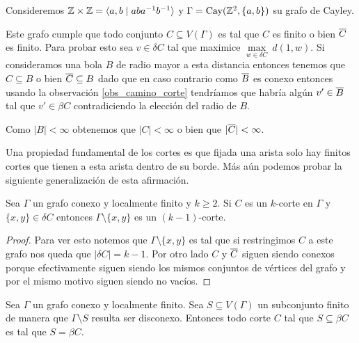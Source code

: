 \documentclass[tesis.tex]{subfiles}
\begin{document}
\begin{ej}
	Consideremos $\mathbb{Z} \times \mathbb{Z} = \langle a,b \mid aba^{-1}b^{-1} \rangle$ y 
	$\Gamma = \text{Cay}(\mathbb{Z}^2, \{ a, b \})$ su grafo de Cayley.
	
	Este grafo cumple que todo conjunto $C \subseteq V(\Gamma)$ es tal que $C$ es finito o bien $\overline C$ es finito.
	Para probar esto sea $v \in \delta C$ tal que
	maximice $\underset{w \in \delta C}{\max} \ d(1,w)$.
	Si consideramos una bola $B$ de radio mayor a esta distancia entonces tenemos que $C \subseteq B$ o bien $\overline C \subseteq B$ dado que en caso contrario como $\overline B$ es conexo entonces usando la observación \ref{obs_camino_corte} tendríamos que habría algún $v' \in \overline B$ tal que $v' \in \beta C$ contradiciendo la elección del radio de $B$.
	
	Como $|B| < \infty$ obtenemos que $|C| < \infty$ o bien que $|\overline C| < \infty$.
\end{ej}

Una propiedad fundamental de los cortes es que fijada una arista solo hay finitos cortes que tienen a esta arista dentro de su borde.	
Más aún podemos probar la siguiente generalización de esta afirmación.
\begin{lema}\label{obs_kCorte_restriccion}
	Sea $\Gamma$ un grafo conexo y localmente finito y $k \ge 2$.
	Si $C$ es un $k$-corte en $\Gamma$ y $\{ x,y  \} \in \delta C$ entonces $\Gamma \setminus \{ x,y \}$ es un $(k-1)$-corte.
\end{lema}

\begin{proof}
	Para ver esto notemos que $\Gamma \setminus \{ x,y \}$ es tal que si restringimos $C$ a este grafo nos queda que $|\delta C| = k-1$.
	Por otro lado $C$ y $\overline C$ siguen siendo conexos porque efectivamente siguen siendo los mismos conjuntos de vértices del grafo y por el mismo motivo siguen siendo no vacíos.


\end{proof}

\begin{lema}\label{lema_corte_disconexo_vertices}
	Sea $\Gamma$ un grafo conexo y localmente finito.
	Sea $S \subseteq V(\Gamma)$ un subconjunto finito de manera que $\Gamma \setminus S$ resulta ser disconexo.
	Entonces todo corte $C$ tal que $S \subseteq \beta C$ es tal que $S = \beta C$.
\end{lema}
\end{document}
